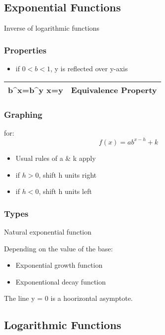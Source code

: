 \documentclass[openany]{book}
\begin{document}
\subsection{Exponential Functions}

Inverse of logarithmic functions

\subsubsection{Properties}

\begin{itemize}
	\item if \(0<b<1\), y is reflected over y-axis
\end{itemize}

\begin{tabular}{|L|c|}
	\hline
	b^x=b^y \Rightarrow x=y & Equivalence Property \\
	\hline
\end{tabular}

\subsubsection{Graphing}

for:
\[f(x)=ab^{x-h}+k\]

\begin{itemize}
	\item Usual rules of a \& k apply
	\item if \(h>0\), shift h units right
	\item if \(h<0\), shift h units left
\end{itemize}

\subsubsection{Types}

Natural exponential function

Depending on the value of the base:
\begin{itemize}
	\item Exponential growth function
	\item Exponentional decay function
\end{itemize}

The line y = 0 is a hoorizontal asymptote.


\subsection{Logarithmic Functions}
\end{document}
